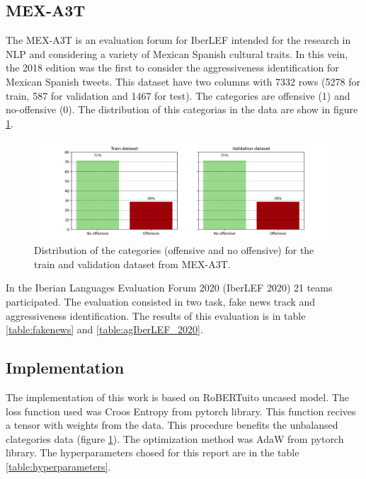 \subsection{MEX-A3T}

The MEX-A3T is an evaluation forum for IberLEF intended for the research in NLP and considering a variety of Mexican Spanish cultural traits. In this vein, the 2018 edition was the first to consider the aggressiveness identification for Mexican Spanish tweets\cite{Carmona_2018}.  This dataset have two columns with 7332 rows (5278 for train, 587 for validation and 1467 for test). The categories are offensive (1) and no-offensive (0). The distribution of this categorias in the data are show in figure \ref{fig:distribution}.

\begin{figure}[H]
    \centering
    \includegraphics[width=17cm]{Graphics/distribution.png}
    \caption{Distribution of the categories (offensive and no offensive) for the train and validation dataset from MEX-A3T.}
    \label{fig:distribution}
\end{figure}

In the Iberian Languages Evaluation Forum 2020 (IberLEF 2020) 21 teams participated. The evaluation consisted in two task, fake news track and aggressiveness identification. The results of this evaluation is in table \ref{table:fakenews} and \ref{table:agIberLEF_2020}.





\subsection{Implementation}

The implementation of this work is based on RoBERTuito uncased model. The loss function used was Croos Entropy from pytorch library. This function recives a tensor with weights from the data. This procedure benefits the unbalansed clategories data (figure \ref{fig:distribution}). The optimization method was AdaW from pytorch library. The hyperparameters chosed for this report are in the table \ref{table:hyperparameters}.

